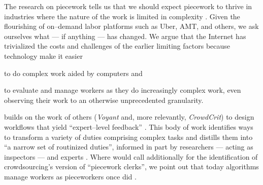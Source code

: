 \documentclass[trackingWork]{subfiles}
\begin{document}
The research on piecework tells us that
we should expect piecework to thrive in industries where
the nature of the work is limited in complexity
\cite{Brown01041990}.
Given the flourishing of on--demand labor platforms such as
Uber, AMT, and others, we ask ourselves
what --- if anything --- has changed.
We argue that
the Internet has trivialized
the costs and challenges of the earlier limiting factors %
  because technology make it easier
  \begin{inlinelist}
  \item to do complex work aided by computers and
  \item to evaluate and manage workers as they do increasingly complex work,
        even observing their work to an otherwise unprecedented granularity.
  \end{inlinelist}


\citeauthor{yuanAlmost} builds on the work of others
(\textit{Voyant} and, more relevantly, \textit{CrowdCrit})
to design workflows that yield ``expert--level feedback''
\cite{yuanAlmost,Xu:2014:VGS:2531602.2531604,Luther:2014:CCA:2556420.2556788}.
This body of work identifies ways to transform a variety of duties comprising complex tasks
and distills them into ``a narrow set of routinized duties'',
informed in part by researchers --- acting as inspectors --- and experts
\cite[quotations from][]{10.2307/23702539}.
Where \citeauthor{10.2307/23702539} would call additionally for the identification of
crowdsourcing's version of ``piecework clerks'', we point out that
today algorithms manage workers as pieceworkers once did
\cite{uberAlgorithm,10.2307/23702539}.
\end{document}
